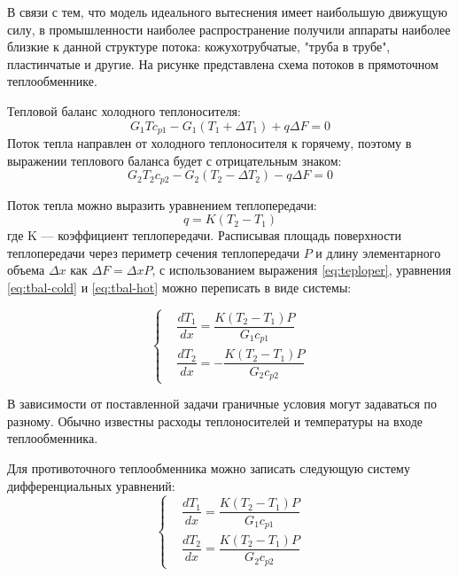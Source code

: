 
В связи с тем, что модель идеального вытеснения имеет наибольшую движущую силу, в промышленности наиболее распространение получили аппараты наиболее близкие к данной структуре потока: кожухотрубчатые, "труба в трубе", пластинчатые и другие. На рисунке представлена схема потоков в прямоточном теплообменнике. 

Тепловой баланс холодного теплоносителя:
\begin{equation}\label{eq:tbal-cold}
	G_1 T c_{p1}-G_1 (T_1+\Delta T_1) + q \Delta F=0
\end{equation}
Поток тепла направлен от холодного теплоносителя к горячему, поэтому в выражении теплового баланса будет с отрицательным знаком:
\begin{equation}\label{eq:tbal-hot}
	G_2 T_2 c_{p2} -G_2 (T_2 - \Delta T_2) -q \Delta F =0
\end{equation}

Поток тепла можно выразить уравнением теплопередачи:
\begin{equation}\label{eq:teploper}
	q=K(T_2-T_1)
\end{equation}
где K --- коэффициент теплопередачи. Расписывая площадь поверхности теплопередачи через периметр сечения теплопередачи $P$ и длину элементарного объема $\Delta x$ как $\Delta F = \Delta x P$, с использованием выражения \ref{eq:teploper}, уравнения \ref{eq:tbal-cold} и \ref{eq:tbal-hot} можно переписать в виде системы:

 \begin{equation}
 \left\{
 \begin{aligned}
 &\dfrac{dT_1}{dx}=\dfrac{K(T_2-T_1)P}{G_1 c_{p1}}        \\
 &\dfrac{dT_2}{dx}=-\dfrac{K(T_2-T_1)P}{G_2 c_{p2}}            
 \end{aligned}
 \right.
 \end{equation}

В зависимости от поставленной задачи граничные условия могут задаваться по разному. Обычно известны расходы теплоносителей и температуры на входе теплообменника.

Для противоточного теплообменника можно записать следующую систему дифференциальных уравнений:
 \begin{equation}
 \left\{
 \begin{aligned}
 &\dfrac{dT_1}{dx}=\dfrac{K(T_2-T_1)P}{G_1 c_{p1}}        \\
 &\dfrac{dT_2}{dx}=\dfrac{K(T_2-T_1)P}{G_2 c_{p2}}            
 \end{aligned}
 \right.
 \end{equation}
 
